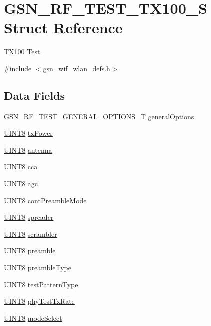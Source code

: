 \hypertarget{a00189}{
\section{GSN\_\-RF\_\-TEST\_\-TX100\_\-S Struct Reference}
\label{a00189}
}


TX100 Test.  




{\ttfamily \#include $<$gsn\_\-wif\_\-wlan\_\-defs.h$>$}

\subsection*{Data Fields}
\begin{DoxyCompactItemize}
\item 
\hyperlink{a00188}{GSN\_\-RF\_\-TEST\_\-GENERAL\_\-OPTIONS\_\-T} \hyperlink{a00189_a5e4e9e8d2b76fbb6bdf201c4aeddd60d}{generalOptions}
\item 
\hyperlink{a00660_gab27e9918b538ce9d8ca692479b375b6a}{UINT8} \hyperlink{a00189_a763a8a049f451428e05835d3c3b466cd}{txPower}
\item 
\hyperlink{a00660_gab27e9918b538ce9d8ca692479b375b6a}{UINT8} \hyperlink{a00189_ad84150bc4d20a5e841d834b269db9901}{antenna}
\item 
\hyperlink{a00660_gab27e9918b538ce9d8ca692479b375b6a}{UINT8} \hyperlink{a00189_a23fb83ac7301b94474f56a34bb365b83}{cca}
\item 
\hyperlink{a00660_gab27e9918b538ce9d8ca692479b375b6a}{UINT8} \hyperlink{a00189_a012088b16d12617334694210cd8ddfb8}{agc}
\item 
\hyperlink{a00660_gab27e9918b538ce9d8ca692479b375b6a}{UINT8} \hyperlink{a00189_a0100696bb872bc8447937bc0e7c786bd}{contPreambleMode}
\item 
\hyperlink{a00660_gab27e9918b538ce9d8ca692479b375b6a}{UINT8} \hyperlink{a00189_a143ba26831a37e201c67c2ccb165bf56}{spreader}
\item 
\hyperlink{a00660_gab27e9918b538ce9d8ca692479b375b6a}{UINT8} \hyperlink{a00189_a808943286ddbb9bc1773a11a1f2c7cb3}{scrambler}
\item 
\hyperlink{a00660_gab27e9918b538ce9d8ca692479b375b6a}{UINT8} \hyperlink{a00189_a4e1f59dc2cd10b195a57cab357e42ff6}{preamble}
\item 
\hyperlink{a00660_gab27e9918b538ce9d8ca692479b375b6a}{UINT8} \hyperlink{a00189_a1af7a22bf7a18ef09da23ae8d0e08d22}{preambleType}
\item 
\hyperlink{a00660_gab27e9918b538ce9d8ca692479b375b6a}{UINT8} \hyperlink{a00189_aed5aa730c4619f7bc2b04f439f4701a9}{testPatternType}
\item 
\hyperlink{a00660_gab27e9918b538ce9d8ca692479b375b6a}{UINT8} \hyperlink{a00189_a7251d0e1cb1d341e0ce219c75c5ce68b}{phyTestTxRate}
\item 
\hyperlink{a00660_gab27e9918b538ce9d8ca692479b375b6a}{UINT8} \hyperlink{a00189_a28cb0da8ec076a6515b226010038aa46}{modeSelect}
\end{DoxyCompactItemize}


